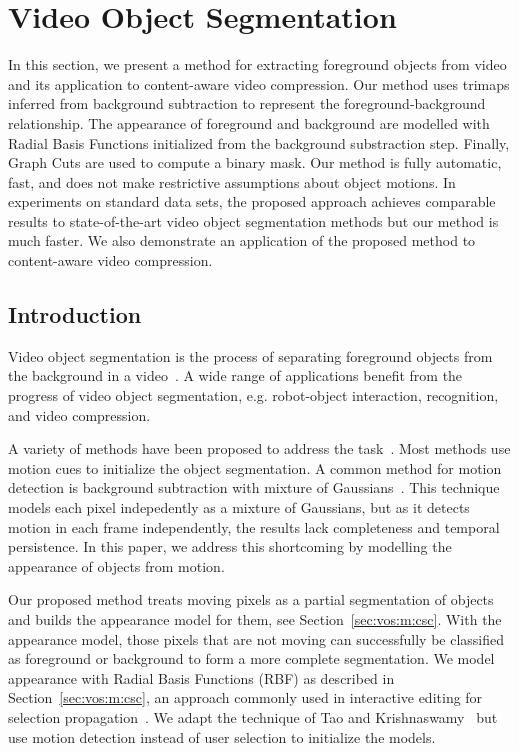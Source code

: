 \chapter{Video Object Segmentation}
\label{chap:vos}

In this section, we present a method for extracting foreground objects from video and its application to content-aware video compression. Our method uses trimaps inferred from background subtraction to represent the foreground-background relationship. The appearance of foreground and background are modelled with Radial Basis Functions initialized from the background substraction step. Finally, Graph Cuts are used to compute a binary mask. Our method is fully automatic, fast, and does not make restrictive assumptions about object motions. In experiments on standard data sets, the proposed approach achieves comparable results to state-of-the-art video object segmentation methods but our method is much faster. We also demonstrate an application of the proposed method to content-aware video compression.

\section{Introduction}
\label{sec:vos:i}

Video object segmentation is the process of separating foreground objects from the background in a video~\cite{papazoglou2013}. A wide range of applications benefit from the progress of video object segmentation, e.g. robot-object interaction, recognition, and video compression.

A variety of methods have been proposed to address the task~\cite{papazoglou2013,ma2012,wang2015,brox2010,taylor2015}. Most methods use motion cues to initialize the object segmentation.
A common method for motion detection is  background subtraction with mixture of Gaussians~\cite{kaewtrakulpong2002,zivkovic2004}. This technique models each pixel indepedently as a mixture of Gaussians, but as it detects motion in each frame independently, the results lack completeness and temporal persistence.
In this paper, we address this shortcoming by modelling the appearance of objects from motion. 

Our proposed method treats moving pixels as a partial segmentation of objects and builds the appearance model for them, see Section~\ref{sec:vos:m:csc}. With the appearance model, those pixels that are not moving can successfully be classified as foreground or background to form a more complete segmentation. We model appearance with Radial Basis Functions (RBF) as described in Section~\ref{sec:vos:m:csc}, an approach commonly used in interactive editing for selection propagation~\cite{li2010,tao2012}. We adapt the technique of Tao and Krishnaswamy~\cite{tao2012} but use motion detection instead of user selection to initialize the models.
 
